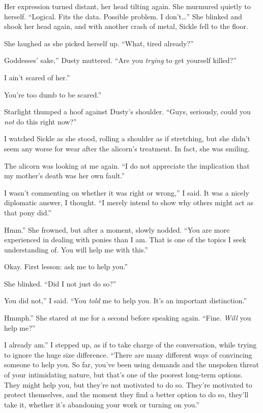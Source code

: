 Her expression turned distant, her head tilting again. She murmured quietly to herself. “Logical. Fits the data. Possible problem. I don’t…” She blinked and shook her head again, and with another crash of metal, Sickle fell to the floor.

She laughed as she picked herself up. “What, tired already?”

\leavevmode{}Goddesses’ sake,” Dusty muttered. “Are you \textit{trying} to get yourself killed?”

\leavevmode{}I ain’t scared of her.”

\leavevmode{}You’re too dumb to be scared.”

Starlight thumped a hoof against Dusty’s shoulder. “Guys, seriously, could you \textit{not} do this right now?”

I watched Sickle as she stood, rolling a shoulder as if stretching, but she didn’t seem any worse for wear after the alicorn’s treatment. In fact, she was smiling.

The alicorn was looking at me again. “I do not appreciate the implication that my mother’s death was her own fault.”

\leavevmode{}I wasn’t commenting on whether it was right or wrong,” I said. It was a nicely diplomatic answer, I thought. “I merely intend to show why others might act as that pony did.”

\leavevmode{}Hmm.” She frowned, but after a moment, slowly nodded. “You are more experienced in dealing with ponies than I am. That is one of the topics I seek understanding of. You will help me with this.”

\leavevmode{}Okay. First lesson: ask me to help you.”

She blinked. “Did I not just do so?”

\leavevmode{}You did not,” I said. “You \textit{told} me to help you. It’s an important distinction.”

\leavevmode{}Hmmph.” She stared at me for a second before speaking again. “Fine. \textit{Will} you help me?”

\leavevmode{}I already am.” I stepped up, as if to take charge of the conversation, while trying to ignore the huge size difference. “There are many different ways of convincing someone to help you. So far, you’ve been using demands and the unspoken threat of your intimidating nature, but that’s one of the poorest long-term options. They might help you, but they’re not motivated to do so. They’re motivated to protect themselves, and the moment they find a better option to do so, they’ll take it, whether it’s abandoning your work or turning on you.”

